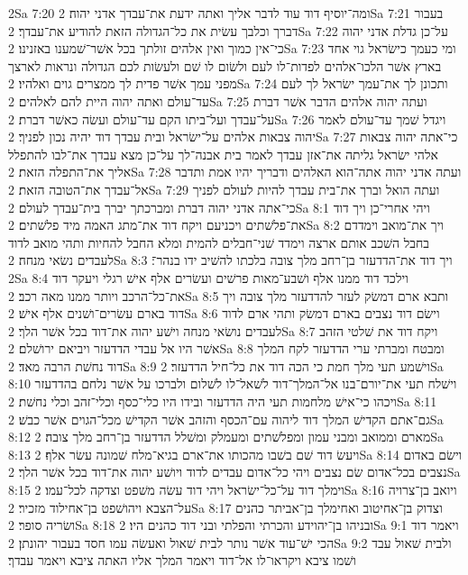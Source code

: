 2Sa 7:20  ומה־יוסיף דוד עוד לדבר אליך ואתה ידעת את־עבדך אדני יהוה׃
2Sa 7:21  בעבור דברך וכלבך עשׂית את כל־הגדולה הזאת להודיע את־עבדך׃
2Sa 7:22  על־כן גדלת אדני יהוה כי־אין כמוך ואין אלהים זולתך בכל אשׁר־שׁמענו באזנינו׃
2Sa 7:23  ומי כעמך כישׂראל גוי אחד בארץ אשׁר הלכו־אלהים לפדות־לו לעם ולשׂום לו שׁם ולעשׂות לכם הגדולה ונראות לארצך מפני עמך אשׁר פדית לך ממצרים גוים ואלהיו׃
2Sa 7:24  ותכונן לך את־עמך ישׂראל לך לעם עד־עולם ואתה יהוה היית להם לאלהים׃
2Sa 7:25  ועתה יהוה אלהים הדבר אשׁר דברת על־עבדך ועל־ביתו הקם עד־עולם ועשׂה כאשׁר דברת׃
2Sa 7:26  ויגדל שׁמך עד־עולם לאמר יהוה צבאות אלהים על־ישׂראל ובית עבדך דוד יהיה נכון לפניך׃
2Sa 7:27  כי־אתה יהוה צבאות אלהי ישׂראל גליתה את־אזן עבדך לאמר בית אבנה־לך על־כן מצא עבדך את־לבו להתפלל אליך את־התפלה הזאת׃
2Sa 7:28  ועתה אדני יהוה אתה־הוא האלהים ודבריך יהיו אמת ותדבר אל־עבדך את־הטובה הזאת׃
2Sa 7:29  ועתה הואל וברך את־בית עבדך להיות לעולם לפניך כי־אתה אדני יהוה דברת ומברכתך יברך בית־עבדך לעולם׃
2Sa 8:1  ויהי אחרי־כן ויך דוד את־פלשׁתים ויכניעם ויקח דוד את־מתג האמה מיד פלשׁתים׃
2Sa 8:2  ויך את־מואב וימדדם בחבל השׁכב אותם ארצה וימדד שׁני־חבלים להמית ומלא החבל להחיות ותהי מואב לדוד לעבדים נשׂאי מנחה׃
2Sa 8:3  ויך דוד את־הדדעזר בן־רחב מלך צובה בלכתו להשׁיב ידו בנהר־׃
2Sa 8:4  וילכד דוד ממנו אלף ושׁבע־מאות פרשׁים ועשׂרים אלף אישׁ רגלי ויעקר דוד את־כל־הרכב ויותר ממנו מאה רכב׃
2Sa 8:5  ותבא ארם דמשׂק לעזר להדדעזר מלך צובה ויך דוד בארם עשׂרים־ושׁנים אלף אישׁ׃
2Sa 8:6  וישׂם דוד נצבים בארם דמשׂק ותהי ארם לדוד לעבדים נושׂאי מנחה וישׁע יהוה את־דוד בכל אשׁר הלך׃
2Sa 8:7  ויקח דוד את שׁלטי הזהב אשׁר היו אל עבדי הדדעזר ויביאם ירושׁלם׃
2Sa 8:8  ומבטח ומברתי ערי הדדעזר לקח המלך דוד נחשׁת הרבה מאד׃
2Sa 8:9  וישׁמע תעי מלך חמת כי הכה דוד את כל־חיל הדדעזר׃
2Sa 8:10  וישׁלח תעי את־יורם־בנו אל־המלך־דוד לשׁאל־לו לשׁלום ולברכו על אשׁר נלחם בהדדעזר ויכהו כי־אישׁ מלחמות תעי היה הדדעזר ובידו היו כלי־כסף וכלי־זהב וכלי נחשׁת׃
2Sa 8:11  גם־אתם הקדישׁ המלך דוד ליהוה עם־הכסף והזהב אשׁר הקדישׁ מכל־הגוים אשׁר כבשׁ׃
2Sa 8:12  מארם וממואב ומבני עמון ומפלשׁתים ומעמלק ומשׁלל הדדעזר בן־רחב מלך צובה׃
2Sa 8:13  ויעשׂ דוד שׁם בשׁבו מהכותו את־ארם בגיא־מלח שׁמונה עשׂר אלף׃
2Sa 8:14  וישׂם באדום נצבים בכל־אדום שׂם נצבים ויהי כל־אדום עבדים לדוד ויושׁע יהוה את־דוד בכל אשׁר הלך׃
2Sa 8:15  וימלך דוד על־כל־ישׂראל ויהי דוד עשׂה משׁפט וצדקה לכל־עמו׃
2Sa 8:16  ויואב בן־צרויה על־הצבא ויהושׁפט בן־אחילוד מזכיר׃
2Sa 8:17  וצדוק בן־אחיטוב ואחימלך בן־אביתר כהנים ושׂריה סופר׃
2Sa 8:18  ובניהו בן־יהוידע והכרתי והפלתי ובני דוד כהנים היו׃
2Sa 9:1  ויאמר דוד הכי ישׁ־עוד אשׁר נותר לבית שׁאול ואעשׂה עמו חסד בעבור יהונתן׃
2Sa 9:2  ולבית שׁאול עבד ושׁמו ציבא ויקראו־לו אל־דוד ויאמר המלך אליו האתה ציבא ויאמר עבדך׃
